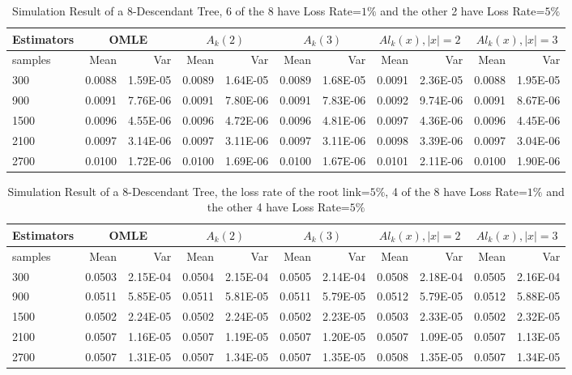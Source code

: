 \documentclass[10pt,onecolumn]{IEEEtran}
\begin{document}
\begin{table*}
\centering
\scriptsize
\begin{tabular}{|l|r|r|r|r|r|r|r|r|r|r|}  \hline
 Estimators &\multicolumn{2}{|c|}{OMLE} & \multicolumn{2}{|c|}{$A_k(2)$} & \multicolumn{2}{|c|}{$A_k(3)$} &\multicolumn{2}{|c|}{$Al_k(x), |x|=2$} & \multicolumn{2}{|c|}{$Al_k(x), |x|=3$}	\\ \hline
samples & Mean & Var &	Mean & Var &	Mean & Var	& Mean & Var &  Mean &	Var	\\ \hline
300&	0.0088&	1.59E-05&   0.0089&	1.64E-05&	0.0089&	1.68E-05&	0.0091&	 2.36E-05&	0.0088&	1.95E-05 \\ \hline
900&	0.0091&	7.76E-06&	0.0091&	7.80E-06&	0.0091&	7.83E-06&	0.0092&	 9.74E-06&	0.0091&	8.67E-06 \\ \hline
1500&	0.0096&	4.55E-06&	0.0096&	4.72E-06&	0.0096&	4.81E-06&	0.0097&	 4.36E-06&	0.0096&	4.45E-06 \\ \hline
2100&	0.0097&	3.14E-06&	0.0097&	3.11E-06&	0.0097&	3.11E-06&	0.0098&	 3.39E-06&	0.0097&	3.04E-06 \\ \hline
2700&	0.0100&	1.72E-06&	0.0100&	1.69E-06&	0.0100&	1.67E-06&	0.0101&	 2.11E-06&	0.0100&	1.90E-06 \\ \hline
\end{tabular}
  \caption{Simulation Result of a 8-Descendant Tree, 6 of the 8 have Loss Rate=$1\%$ and the other 2 have Loss Rate=$5\%$}
  \label{Tab3}
\end{table*}

\begin{table*}
\centering
\scriptsize
\begin{tabular}{|l|r|r|r|r|r|r|r|r|r|r|}  \hline
 Estimators &\multicolumn{2}{|c|}{OMLE} & \multicolumn{2}{|c|}{$A_k(2)$} & \multicolumn{2}{|c|}{$A_k(3)$} &\multicolumn{2}{|c|}{$Al_k(x), |x|=2$} & \multicolumn{2}{|c|}{$Al_k(x), |x|=3$}	\\ \hline
samples & Mean & Var &	Mean & Var &	Mean & Var	& Mean & Var &  Mean &	Var	\\ \hline
300&	0.0503&	2.15E-04&	0.0504&	2.15E-04&	0.0505&	2.14E-04&	0.0508&	2.18E-04&	0.0505&	2.16E-04\\ \hline
900&	0.0511&	5.85E-05&	0.0511&	5.81E-05&	0.0511&	5.79E-05&	0.0512&	5.79E-05&	0.0512&	5.88E-05\\ \hline
1500&	0.0502&	2.24E-05&	0.0502&	2.24E-05&	0.0502&	2.23E-05&	0.0503&	2.33E-05&	0.0502&	2.32E-05\\ \hline
2100&	0.0507&	1.16E-05&	0.0507&	1.19E-05&	0.0507&	1.20E-05&	0.0507&	1.09E-05&	0.0507&	1.13E-05\\ \hline
2700&	0.0507&	1.31E-05&	0.0507&	1.34E-05&	0.0507&	1.35E-05&	0.0508&	1.35E-05&	0.0507&	1.34E-05\\ \hline
\end{tabular}
  \caption{Simulation Result of a 8-Descendant Tree, the loss rate of the root link=$5\%$, 4 of the 8 have Loss Rate=$1\%$ and the other 4 have Loss Rate=$5\%$}
  \label{Tab4}
\end{table*}
\end{document}
